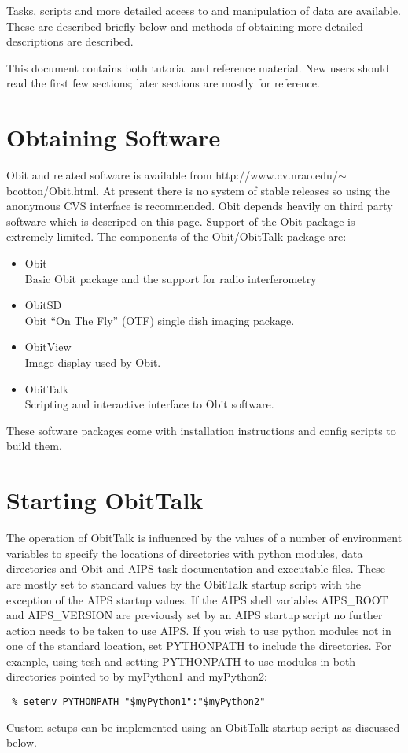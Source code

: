 \documentclass[11pt]{report}
\begin{document}
   Tasks, scripts and more detailed access to and manipulation of data
are available.  These are described briefly below and methods of
obtaining more detailed descriptions are described.

This document contains both tutorial and reference material.
New users should read the first few sections; later sections are
mostly for reference.

\section {Obtaining Software}
Obit and related software is available from
http://www.cv.nrao.edu/$\sim$bcotton/Obit.html. 
At present there is no system of stable releases so using the
anonymous CVS interface is recommended.
Obit depends heavily on third party software which is descriped on
this page.
Support of the Obit package is extremely limited.
The components of the Obit/ObitTalk package are:
\begin{itemize}
\item Obit\\
Basic Obit package and the support for radio interferometry
\item ObitSD\\
Obit ``On The Fly'' (OTF) single dish imaging package.
\item ObitView\\
Image display used by Obit.
\item ObitTalk\\
Scripting and interactive interface to Obit software.
\end{itemize}
These software packages come with installation instructions and config
scripts to build them.

\section {Starting ObitTalk}
The operation of ObitTalk is influenced by the values of a number of
environment variables to specify the locations of directories with
python modules, data directories and Obit and AIPS task documentation
and executable files.
These are mostly set to standard values by the ObitTalk startup script
with the exception of the AIPS startup values.
If the AIPS shell variables AIPS\_ROOT and AIPS\_VERSION are
previously set by an AIPS startup script no further action needs to be
taken to use AIPS.
If you wish to use python modules not in one of the standard location,
set PYTHONPATH to include the directories.
For example, using tcsh and setting PYTHONPATH to use modules in both
directories pointed to by myPython1 and myPython2:
\begin{verbatim}
 % setenv PYTHONPATH "$myPython1":"$myPython2"
\end{verbatim}
Custom setups can be implemented using an ObitTalk startup script as
discussed below.
\end{document}

